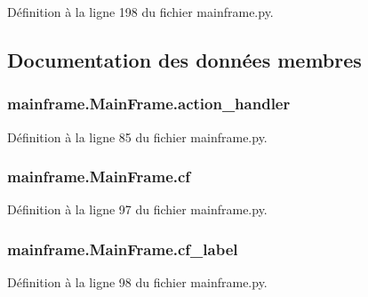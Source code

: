 Définition à la ligne 198 du fichier mainframe.\+py.



\subsection{Documentation des données membres}
\hypertarget{classmainframe_1_1_main_frame_af7330830e57d05409e91fd989cbbcc5d}{}
\subsubsection[{action\+\_\+handler}]{\setlength{\rightskip}{0pt plus 5cm}mainframe.\+Main\+Frame.\+action\+\_\+handler}\label{classmainframe_1_1_main_frame_af7330830e57d05409e91fd989cbbcc5d}


Définition à la ligne 85 du fichier mainframe.\+py.

\hypertarget{classmainframe_1_1_main_frame_adb97c2d753e9cd597624f159d89f1f88}{}
\subsubsection[{cf}]{\setlength{\rightskip}{0pt plus 5cm}mainframe.\+Main\+Frame.\+cf}\label{classmainframe_1_1_main_frame_adb97c2d753e9cd597624f159d89f1f88}


Définition à la ligne 97 du fichier mainframe.\+py.

\hypertarget{classmainframe_1_1_main_frame_aecb8392168113d119289ab93e8cef97e}{}
\subsubsection[{cf\+\_\+label}]{\setlength{\rightskip}{0pt plus 5cm}mainframe.\+Main\+Frame.\+cf\+\_\+label}\label{classmainframe_1_1_main_frame_aecb8392168113d119289ab93e8cef97e}


Définition à la ligne 98 du fichier mainframe.\+py.

\hypertarget{classmainframe_1_1_main_frame_a2ea855c763e8591d4a828656f75ef6f1}{}
